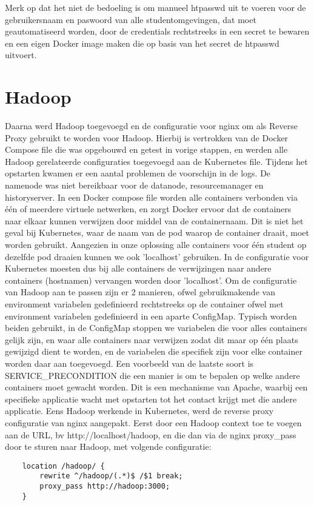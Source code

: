Merk op dat het niet de bedoeling is om manueel htpasswd uit te voeren voor de gebruikersnaam en paswoord van alle studentomgevingen, dat moet geautomatiseerd worden, door de credentials rechtstreeks in een secret te bewaren en een eigen Docker image maken die op basis van het secret de htpasswd uitvoert.

\section{Hadoop}
Daarna werd Hadoop toegevoegd en de configuratie voor nginx om als Reverse Proxy gebruikt te worden voor Hadoop. Hierbij is vertrokken van de Docker Compose file die was opgebouwd en getest in vorige stappen, en werden alle Hadoop gerelateerde configuraties toegevoegd aan de Kubernetes file. Tijdens het opstarten kwamen er een aantal problemen de voorschijn in de logs. De namenode was niet bereikbaar voor de datanode, resourcemanager en historyserver.
In een Docker compose file worden alle containers verbonden via \'e\'en of meerdere virtuele netwerken, en zorgt Docker ervoor dat de containers naar elkaar kunnen verwijzen door middel van de containernaam. Dit is niet het geval bij Kubernetes, waar de naam van de pod waarop de container draait, moet worden gebruikt. Aangezien in onze oplossing alle containers voor \'e\'en student op dezelfde pod draaien kunnen we ook 'localhost' gebruiken.\newline
In de configuratie voor Kubernetes moesten dus bij alle containers de verwijzingen naar andere containers (hostnamen) vervangen worden door 'localhost'.
\newline
\newline
Om de configuratie van Hadoop aan te passen zijn er 2 manieren, ofwel gebruikmakende van environment variabelen gedefinieerd rechtstreeks op de container ofwel met environment variabelen gedefinieerd in een aparte ConfigMap. Typisch worden beiden gebruikt, in de ConfigMap stoppen we variabelen die voor alles containers gelijk zijn, en waar alle containers naar verwijzen zodat dit maar op \'e\'en plaats gewijzigd dient te worden, en de variabelen die specifiek zijn voor elke container worden daar aan toegevoegd. Een voorbeeld van de laatste soort is SERVICE\_PRECONDITION die een manier is om te bepalen op welke andere containers moet gewacht worden. Dit is een mechanisme van Apache, waarbij een specifieke applicatie wacht met opstarten tot het contact krijgt met die andere applicatie.
\newline
\newline
Eens Hadoop werkende in Kubernetes, werd de reverse proxy configuratie van nginx aangepakt. Eerst door een Hadoop context toe te voegen aan de URL, bv http://localhost/hadoop, en die dan via de nginx proxy\_pass door te sturen naar Hadoop, met volgende configuratie:
\newline
\newline
\begin{lstlisting}
    location /hadoop/ {
        rewrite ^/hadoop/(.*)$ /$1 break;
        proxy_pass http://hadoop:3000;
    }
\end{lstlisting}

